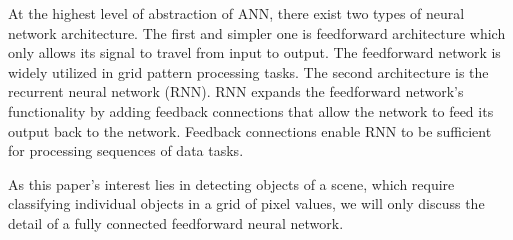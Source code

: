 At the highest level of abstraction of ANN, there exist two types of neural network architecture. The first and simpler one is feedforward architecture which only allows its signal to travel from input to output. The feedforward network is widely utilized in grid pattern processing tasks. The second architecture is the recurrent neural network (RNN). RNN expands the feedforward network's functionality by adding feedback connections that allow the network to feed its output back to the network. Feedback connections enable RNN to be sufficient for processing sequences of data tasks.

As this paper's interest lies in detecting objects of a scene, which require classifying individual objects in a grid of pixel values, we will only discuss the detail of a fully connected feedforward neural network.





